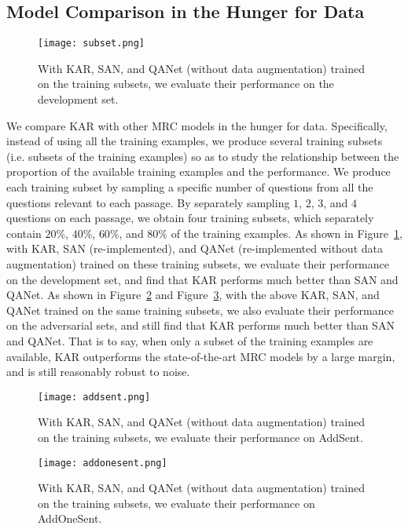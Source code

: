 \documentclass[11pt,a4paper]{article}
\begin{document}
\subsection{Model Comparison in the Hunger for Data}
\begin{figure}
\centering
\texttt{[image: subset.png]}
\caption{\label{f2} With KAR, SAN, and QANet (without data augmentation) trained on the training subsets, we evaluate their performance on the development set.}
\end{figure}
We compare KAR with other MRC models in the hunger for data. Specifically, instead of using all the training examples, we produce several training subsets (i.e. subsets of the training examples) so as to study the relationship between the proportion of the available training examples and the performance. We produce each training subset by sampling a specific number of questions from all the questions relevant to each passage. By separately sampling $1$, $2$, $3$, and $4$ questions on each passage, we obtain four training subsets, which separately contain $20\%$, $40\%$, $60\%$, and $80\%$ of the training examples. As shown in Figure~\ref{f2}, with KAR, SAN (re-implemented), and QANet (re-implemented without data augmentation) trained on these training subsets, we evaluate their performance on the development set, and find that KAR performs much better than SAN and QANet. As shown in Figure~\ref{f3} and Figure~\ref{f4}, with the above KAR, SAN, and QANet trained on the same training subsets, we also evaluate their performance on the adversarial sets, and still find that KAR performs much better than SAN and QANet. That is to say, when only a subset of the training examples are available, KAR outperforms the state-of-the-art MRC models by a large margin, and is still reasonably robust to noise.
\begin{figure}
\centering
\texttt{[image: addsent.png]}
\caption{\label{f3} With KAR, SAN, and QANet (without data augmentation) trained on the training subsets, we evaluate their performance on AddSent.}
\end{figure}
\begin{figure}
\centering
\texttt{[image: addonesent.png]}
\caption{\label{f4} With KAR, SAN, and QANet (without data augmentation) trained on the training subsets, we evaluate their performance on AddOneSent.}
\end{figure}
\end{document}
